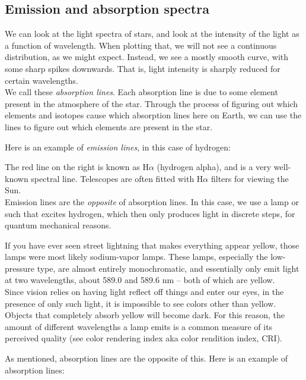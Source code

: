 \subsection{Emission and absorption spectra}

We can look at the light spectra of stars, and look at the intensity of the light as a function of wavelength. When plotting that, we will not see a continuous distribution, as we might expect. Instead, we see a mostly smooth curve, with some sharp spikes downwards. That is, light intensity is sharply reduced for certain wavelengths.\\
We call these \emph{absorption lines}. Each absorption line is due to some element present in the atmosphere of the star. Through the process of figuring out which elements and isotopes cause which absorption lines here on Earth, we can use the lines to figure out which elements are present in the star.

Here is an example of \emph{emission lines}, in this case of hydrogen:


The red line on the right is known as H$\alpha$ (hydrogen alpha), and is a very well-known spectral line. Telescopes are often fitted with H$\alpha$ filters for viewing the Sun.\\
Emission lines are the \emph{opposite} of absorption lines. In this case, we use a lamp or such that excites hydrogen, which then only produces light in discrete steps, for quantum mechanical reasons.

If you have ever seen street lightning that makes everything appear yellow, those lamps were most likely sodium-vapor lamps. These lamps, especially the low-pressure type, are almost entirely monochromatic, and essentially only emit light at two wavelengths, about 589.0 and 589.6 nm -- both of which are yellow.\\
Since vision relies on having light reflect off things and enter our eyes, in the presence of only such light, it is impossible to see colors other than yellow. Objects that completely absorb yellow will become dark. For this reason, the amount of different wavelengths a lamp emits is a common measure of its perceived quality (see color rendering index aka color rendition index, CRI).

As mentioned, absorption lines are the opposite of this. Here is an example of absorption lines:


